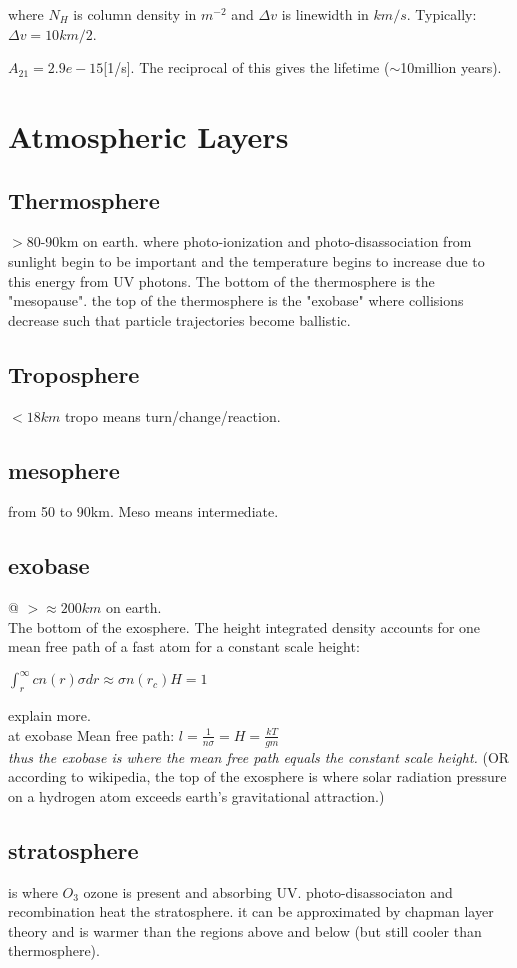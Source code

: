 \documentclass[12pt]{report}
\begin{document}
where $N_H$ is column density in $m^{-2}$ and $\Delta v$ is linewidth in $km/s$. Typically: $\Delta v=10km/2$. 

\(A_{21}=2.9e-15\)[1/s]. The reciprocal of this gives the lifetime ($\sim$10million years).


\section{Atmospheric Layers}
\subsection{Thermosphere}
$>$80-90km on earth. where photo-ionization and photo-disassociation from sunlight begin to be important and the temperature begins to increase due to this energy from UV photons. The bottom of the thermosphere is the "mesopause". the top of the thermosphere is the "exobase" where collisions decrease such that  particle trajectories become ballistic.\\ 
\subsection{Troposphere}
$<18km$ tropo means turn/change/reaction.\\
\subsection{mesophere}
from 50 to 90km. Meso means intermediate.
\subsection{exobase}
@ $>\approx 200km$ on earth.\\
The bottom of the exosphere. 
The height integrated density accounts for one mean free path of a fast atom for a constant scale height:

\(\int^{\infty}_{r} c n(r) \sigma dr \approx \sigma n(r_c)H =1\) 

explain more.\\
at exobase Mean free path: $\boxed{l=\frac{1}{n\sigma}=H=\frac{kT}{gm}}$\\
 \emph{thus the exobase is where the mean free path equals the constant scale height.}
(OR according to wikipedia, the top of the exosphere is where solar radiation pressure  on a hydrogen atom exceeds earth's gravitational attraction.)\\
\subsection{stratosphere} is where $O_3$ ozone is present and absorbing UV. photo-disassociaton and recombination heat the stratosphere. it can be approximated by chapman layer theory and is warmer than the regions above and below (but still cooler than thermosphere). %
\end{document}

